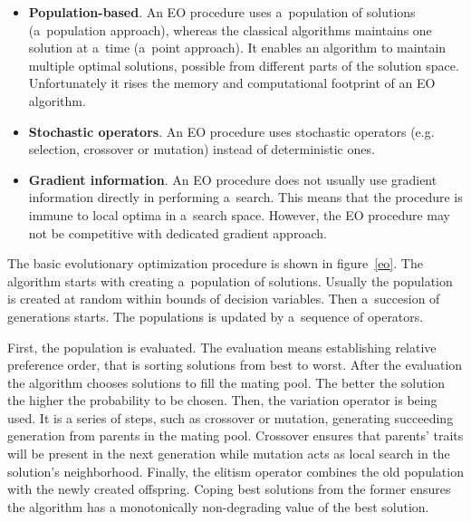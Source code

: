 \begin{itemize}
\item \textbf{Population-based}. An EO procedure uses a~population of
  solutions (a~population approach), whereas the classical algorithms
  maintains one solution at a~time (a~point approach). It enables an algorithm
  to maintain multiple optimal solutions, possible from different parts of the
  solution space. Unfortunately it rises the memory and computational
  footprint of an EO algorithm.
\item \textbf{Stochastic operators}. An EO procedure uses stochastic operators
  (e.g. selection, crossover or mutation) instead of deterministic ones.
\item \textbf{Gradient information}. An EO procedure does not usually use
  gradient information directly in performing a~search. This means that the
  procedure is immune to local optima in a~search space. However, the EO
  procedure may not be competitive with dedicated gradient approach.
\end{itemize}

The basic evolutionary optimization procedure is shown in figure~\ref{eo}. The
algorithm starts with creating a~population of solutions. Usually the
population is created at random within bounds of decision variables. Then
a~succesion of generations starts. The populations is updated by a~sequence of
operators.

First, the population is evaluated. The evaluation means establishing relative
preference order, that is sorting solutions from best to worst. After the
evaluation the algorithm chooses solutions to fill the mating pool. The better
the solution the higher the probability to be chosen. Then, the variation
operator is being used. It is a series of steps, such as crossover or
mutation, generating succeeding generation from parents in the mating
pool. Crossover ensures that parents' traits will be present in the next
generation while mutation acts as local search in the solution's
neighborhood. Finally, the elitism operator combines the old population with
the newly created offspring. Coping best solutions from the former ensures the
algorithm has a monotonically non-degrading value of the best solution.

